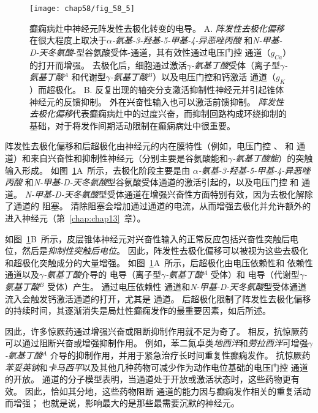 \begin{figure}[htbp]
	\centering
	\texttt{[image: chap58/fig\_58\_5]}
	\caption{癫痫病灶中神经元阵发性去极化转变的电导。
		A. \textit{阵发性去极化偏移}在很大程度上取决于\textit{$\alpha$-氨基-3-羟基-5-甲基-4-异恶唑丙酸} 和\textit{N-甲基-D-天冬氨酸}-型谷氨酸受体-通道，其有效性通过电压门控  通道（$ g_{Ca} $）的打开而增强。
		去极化后，细胞通过激活\textit{$\gamma$-氨基丁酸}受体（离子型\textit{$\gamma$-氨基丁酸}$^A$ 和代谢型\textit{$\gamma$-氨基丁酸}$^B$）以及电压门控和钙激活  通道（$ g_K $）而超极化\cite{lothman1993neurobiology}。
		B. 反复出现的轴突分支激活抑制性神经元并引起锥体神经元的反馈抑制。
		外在兴奋性输入也可以激活前馈抑制。
		\textit{阵发性去极化偏移}代表癫痫病灶中的过度兴奋，而抑制回路构成环绕抑制的基础，对于将发作间期活动限制在癫痫病灶中很重要。}
	\label{fig:58_5}
\end{figure}


阵发性去极化偏移和后超极化由神经元的内在膜特性（例如，电压门控 、 和  通道）和来自兴奋性和抑制性神经元（分别主要是谷氨酸能和\textit{$\gamma$-氨基丁酸能}）的突触输入形成。
如图~\ref{fig:58_5}A~所示，去极化阶段主要是由 \textit{$\alpha$-氨基-3-羟基-5-甲基-4-异恶唑丙酸} 和\textit{N-甲基-D-天冬氨酸}型谷氨酸受体通道的激活引起的，以及电压门控  和  通道。
\textit{N-甲基-D-天冬氨酸}型受体通道在增强兴奋性方面特别有效，因为去极化解除了通道的  阻塞。
清除阻塞会增加通过通道的电流，从而增强去极化并允许额外的  进入神经元（第~\ref{chap:chap13}~章）。


如图~\ref{fig:58_5}B~所示，皮层锥体神经元对兴奋性输入的正常反应包括兴奋性突触后电位，然后是\textit{抑制性突触后电位}。
因此，阵发性去极化偏移可以被视为这些去极化和超极化突触成分的大量增强。
如图~\ref{fig:58_5}A~所示，后超极化由电压依赖性和  依赖性  通道以及\textit{$\gamma$-氨基丁酸}介导的  电导（离子型\textit{$\gamma$-氨基丁酸}$^A$ 受体）和  电导（代谢型\textit{$\gamma$-氨基丁酸}$^B$ 受体）产生。
 通过电压依赖性  通道和\textit{N-甲基-D-天冬氨酸}型受体通道流入会触发钙激活通道的打开，尤其是  通道。
后超极化限制了阵发性去极化偏移的持续时间，其逐渐消失是局灶性癫痫发作的最重要因素，如后所述。


因此，许多惊厥药通过增强兴奋或阻断抑制作用就不足为奇了。
相反，抗惊厥药可以通过阻断兴奋或增强抑制作用。 例如，苯二氮卓类\textit{地西泮}和\textit{劳拉西泮}可增强\textit{$\gamma$-氨基丁酸}$^A$ 介导的抑制作用，并用于紧急治疗长时间重复性癫痫发作。
抗惊厥药\textit{苯妥英钠}和\textit{卡马西平}以及其他几种药物可减少作为动作电位基础的电压门控  通道的开放。
 通道的分子模型表明，当通道处于开放或激活状态时，这些药物更有效。
因此，恰如其分地，这些药物阻断  通道的能力因与癫痫发作相关的重复活动而增强；
也就是说，影响最大的是那些最需要沉默的神经元。



